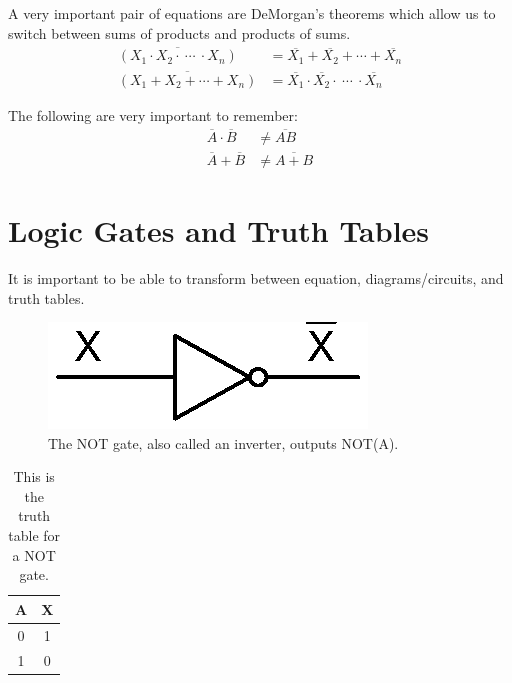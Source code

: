 A very important pair of equations are DeMorgan's theorems which allow us to switch between sums of 
products and products of sums.
\begin{subequations}
	\begin{align}
		\overline{(X_1\cdot X_2 \cdot \ \cdots\  \cdot X_n)} & = \overline{X_1} + \overline{X_2} + \cdots + \overline{X_n} \\
		\overline{(X_1 + X_2 + \cdots + X_n)} & = \overline{X_1}\cdot\overline{X_2}\cdot\ \cdots\ \cdot\overline{X_n}
	\end{align}
\end{subequations}

The following are very important to remember:
\begin{subequations}
	\begin{align}
		\overline{A} \cdot \overline{B} &\neq \overline{AB} \\
		\overline{A} + \overline{B} &\neq \overline{A + B} 
	\end{align}
\end{subequations}

\section{Logic Gates and Truth Tables}
It is important to be able to transform between equation, diagrams/circuits, and truth tables.
\begin{figure}[!htb]
	\centering
	\includegraphics[scale=0.7]{logic/NOT.eps}
	\caption{The NOT gate, also called an inverter, outputs NOT(A).}
	\label{fig:notgate}
\end{figure} 

\begin{table}[!ht]
	\centering
	\begin{tabular}{| c | c |}
		\hline
		A & X \\ 
		\hline
		0 & 1 \\ \hline
		1 & 0 \\ \hline
	\end{tabular}
	\caption{This is the truth table for a NOT gate.}
	\label{table:notgate}
\end{table}


